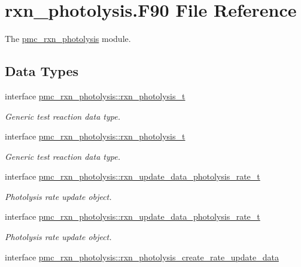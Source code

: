 \hypertarget{rxn__photolysis_8_f90}{}\section{rxn\+\_\+photolysis.\+F90 File Reference}
\label{rxn__photolysis_8_f90}


The \mbox{\hyperlink{namespacepmc__rxn__photolysis}{pmc\+\_\+rxn\+\_\+photolysis}} module.  


\subsection*{Data Types}
\begin{DoxyCompactItemize}
\item 
interface \mbox{\hyperlink{structpmc__rxn__photolysis_1_1rxn__photolysis__t}{pmc\+\_\+rxn\+\_\+photolysis\+::rxn\+\_\+photolysis\+\_\+t}}
\begin{DoxyCompactList}\small\item\em Generic test reaction data type. \end{DoxyCompactList}\item 
interface \mbox{\hyperlink{structpmc__rxn__photolysis_1_1rxn__photolysis__t}{pmc\+\_\+rxn\+\_\+photolysis\+::rxn\+\_\+photolysis\+\_\+t}}
\begin{DoxyCompactList}\small\item\em Generic test reaction data type. \end{DoxyCompactList}\item 
interface \mbox{\hyperlink{structpmc__rxn__photolysis_1_1rxn__update__data__photolysis__rate__t}{pmc\+\_\+rxn\+\_\+photolysis\+::rxn\+\_\+update\+\_\+data\+\_\+photolysis\+\_\+rate\+\_\+t}}
\begin{DoxyCompactList}\small\item\em Photolysis rate update object. \end{DoxyCompactList}\item 
interface \mbox{\hyperlink{structpmc__rxn__photolysis_1_1rxn__update__data__photolysis__rate__t}{pmc\+\_\+rxn\+\_\+photolysis\+::rxn\+\_\+update\+\_\+data\+\_\+photolysis\+\_\+rate\+\_\+t}}
\begin{DoxyCompactList}\small\item\em Photolysis rate update object. \end{DoxyCompactList}\item 
interface \mbox{\hyperlink{interfacepmc__rxn__photolysis_1_1rxn__photolysis__create__rate__update__data}{pmc\+\_\+rxn\+\_\+photolysis\+::rxn\+\_\+photolysis\+\_\+create\+\_\+rate\+\_\+update\+\_\+data}}

\end{DoxyCompactItemize}
